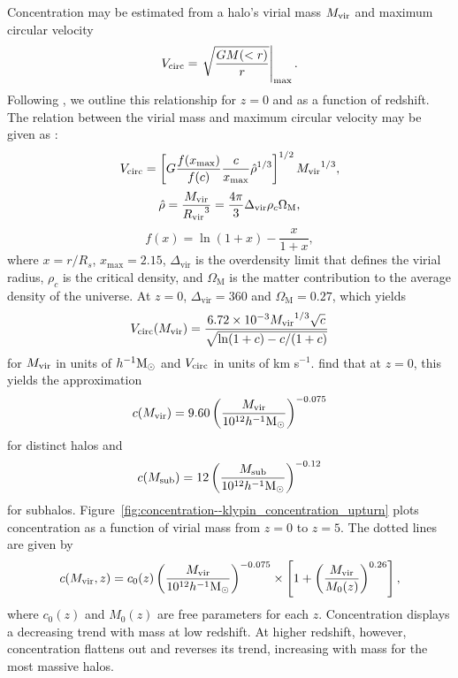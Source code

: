 Concentration may be estimated from a halo's virial mass ${M_{\mathrm{vir}}}$ and maximum circular velocity
\begin{equation}
	{V_{\mathrm{circ}}} = \left. \sqrt{\frac{GM(<r)}{r}} \right|_{\mathrm{\max}}.
\end{equation}
Following \citet{2011ApJ...740..102K}, we outline this relationship for $z = 0$ and as a function of redshift.  The relation between the virial mass and maximum circular velocity may be given as \citep{2001ApJ...554..903K}:
\begin{equation}
	{V_{\mathrm{circ}}} = \left[ G \frac{f(x_{\max})}{f(c)} \frac{c}{x_{\max}} \hat{\rho}^{1/3} \right]^{1/2} {M_{\mathrm{vir}}}^{1/3},
\end{equation}
\begin{equation}
	\hat{\rho} = \frac{{M_{\mathrm{vir}}}}{{R_{\mathrm{vir}}}^{3}} = \frac{4 \pi}{3} \Delta_{\mathrm{vir}} \rho_{c} \Omega_{\mathrm{M}},
\end{equation}
\begin{equation}
	f(x) = \ln(1 + x) - \frac{x}{1 + x},
\end{equation}
where $x = r / R_{s}$, $x_{\max} = 2.15$, $\Delta_{\mathrm{vir}}$ is the overdensity limit that defines the virial radius, $\rho_{c}$ is the critical density, and $\Omega_{\mathrm{M}}$ is the matter contribution to the average density of the universe.  At $z = 0$, $\Delta_{\mathrm{vir}} = 360$ and $\Omega_{\mathrm{M}} = 0.27$, which yields
\begin{equation}
	{V_{\mathrm{circ}}}({M_{\mathrm{vir}}}) = \frac{6.72 \times 10^{-3} {M_{\mathrm{vir}}}^{1/3} \sqrt{c}}{\sqrt{\ln(1 + c) - c / (1 + c)}}
\end{equation}
for ${M_{\mathrm{vir}}}$ in units of $h^{-1} {\rm M_\odot}$ and ${V_{\mathrm{circ}}}$ in units of km s$^{-1}$.  \citet{2011ApJ...740..102K} find that at $z = 0$, this yields the approximation
\begin{equation}
	c({M_{\mathrm{vir}}}) = 9.60 \left( \frac{{M_{\mathrm{vir}}}}{10^{12} h^{-1} {\rm M_\odot}} \right)^{-0.075}
\end{equation}
for distinct halos and
\begin{equation}
	c(M_{\mathrm{sub}}) = 12 \left( \frac{M_{\mathrm{sub}}}{10^{12} h^{-1} {\rm M_\odot}} \right)^{-0.12}
\end{equation}
for subhalos.  Figure~\ref{fig:concentration--klypin_concentration_upturn} plots concentration as a function of virial mass from $z = 0$ to $z = 5$.  The dotted lines are given by
\begin{equation} \label{eq:early_universe--concentration_mass_upturn}
	c({M_{\mathrm{vir}}},z) = c_{0}(z) \left( \frac{{M_{\mathrm{vir}}}}{10^{12} h^{-1} {\rm M_\odot}} \right)^{-0.075} \times \left[ 1 + \left( \frac{{M_{\mathrm{vir}}}}{M_{0}(z)} \right)^{0.26} \right],
\end{equation}
where $c_{0}(z)$ and $M_{0}(z)$ are free parameters for each $z$.  Concentration displays a decreasing trend with mass at low redshift.  At higher redshift, however, concentration flattens out and reverses its trend, increasing with mass for the most massive halos.

